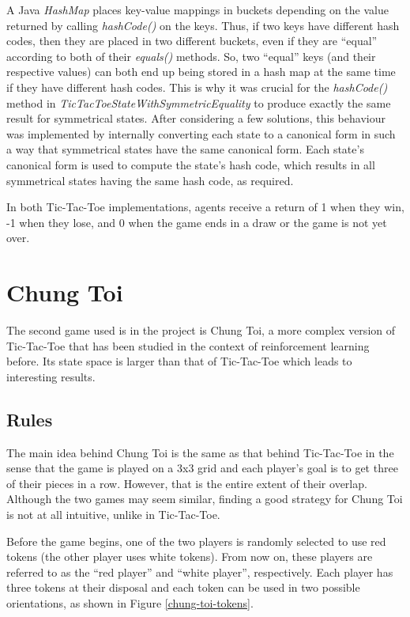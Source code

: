 \documentclass[11pt,a4paper]{report}
\begin{document}
A Java \emph{HashMap} places key-value mappings in buckets depending on the value returned by calling \emph{hashCode()} on the keys. Thus, if two keys have different hash codes, then they are placed in two different buckets, even if they are ``equal'' according to both of their \emph{equals()} methods. So, two ``equal'' keys (and their respective values) can both end up being stored in a hash map at the same time if they have different hash codes. This is why it was crucial for the \emph{hashCode()} method in \emph{TicTacToeStateWithSymmetricEquality} to produce exactly the same result for symmetrical states. After considering a few solutions, this behaviour was implemented by internally converting each state to a canonical form in such a way that symmetrical states have the same canonical form. Each state's canonical form is used to compute the state's hash code, which results in all symmetrical states having the same hash code, as required.

In both Tic-Tac-Toe implementations, agents receive a return of 1 when they win, -1 when they lose, and 0 when the game ends in a draw or the game is not yet over.


\section{Chung Toi}
\label{sec:ChungToi}

The second game used is in the project is Chung Toi, a more complex version of Tic-Tac-Toe that has been studied in the context of reinforcement learning before. Its state space is larger than that of Tic-Tac-Toe which leads to interesting results.


\subsection{Rules}

The main idea behind Chung Toi \cite{chung-toi-rules} is the same as that behind Tic-Tac-Toe in the sense that the game is played on a 3x3 grid and each player's goal is to get three of their pieces in a row. However, that is the entire extent of their overlap. Although the two games may seem similar, finding a good strategy for Chung Toi is not at all intuitive, unlike in Tic-Tac-Toe.

Before the game begins, one of the two players is randomly selected to use red tokens (the other player uses white tokens). From now on, these players are referred to as the ``red player'' and ``white player'', respectively. Each player has three tokens at their disposal and each token can be used in two possible orientations, as shown in Figure \ref{chung-toi-tokens}.
\end{document}
